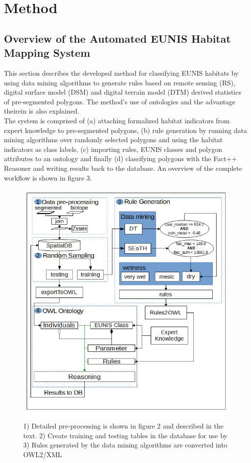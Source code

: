 \documentclass[authoryear, review,12pt,number]{elsarticle}
\begin{document}
\section{Method}
\subsection{Overview of the Automated EUNIS Habitat Mapping System}
This section describes the developed method for classifying
EUNIS habitats by using data mining algorithms to generate rules based on remote
sensing (RS), digital surface model (DSM) and digital terrain model (DTM)
derived statistics of pre-segmented polygons. The method's use of ontologies and
the advantage theirein is also explained.\\
The system is comprised of (a) attaching formalized habitat indicators from
expert knowledge to pre-segmented polygons, (b) rule generation by running data
mining algorithms over randomly selected polygons and using the habitat
indicators as class labels, (c) importing rules, EUNIS classes and polygon
attributes to an ontology and finally (d) classifying polygons with the Fact++
Reasoner and writing results back to the database. An overview of the complete
workflow is shown in figure 3. 
\begin{figure}
	\includegraphics[width=1\linewidth]{diagrams/another_workflow_diagram_large.png}
	\caption{1) Detailed pre-processing is shown in figure 2 and described in the
	text.
	2) Create training and testing tables in the database for use by 3)  Rules
	generated by the data mining algorithms are converted into OWL2/XML }
\end{figure}
\end{document}
